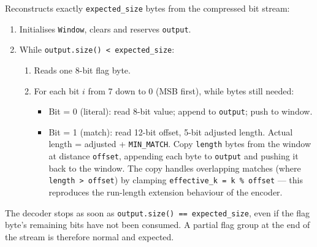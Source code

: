 Reconstructs exactly \texttt{expected\_size} bytes from the compressed bit stream:

\begin{enumerate}
  \item Initialises \texttt{Window}, clears and reserves \texttt{output}.
  \item While \texttt{output.size() < expected\_size}:
    \begin{enumerate}
      \item Reads one 8-bit flag byte.
      \item For each bit $i$ from 7 down to 0 (MSB first), while bytes still needed:
        \begin{itemize}
          \item Bit = 0 (literal): read 8-bit value; append to \texttt{output}; push to window.
          \item Bit = 1 (match): read 12-bit offset, 5-bit adjusted length.
                Actual length = adjusted + \texttt{MIN\_MATCH}.
                Copy \texttt{length} bytes from the window at distance \texttt{offset},
                appending each byte to \texttt{output} and pushing it back to the window.
                The copy handles overlapping matches (where \texttt{length > offset})
                by clamping \texttt{effective\_k = k \% offset} --- this reproduces the
                run-length extension behaviour of the encoder.
        \end{itemize}
    \end{enumerate}
\end{enumerate}

The decoder stops as soon as \texttt{output.size() == expected\_size}, even if the
flag byte's remaining bits have not been consumed.
A partial flag group at the end of the stream is therefore normal and expected.
